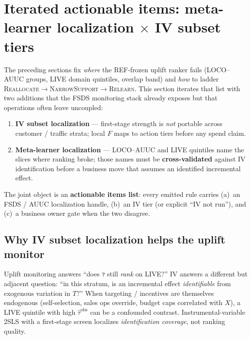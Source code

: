
\section{Iterated actionable items: meta-learner localization $\times$ IV subset tiers}
\label{sec:actionables-meta-iv}

The preceding sections fix \emph{where} the REF-frozen uplift ranker fails
(LOCO--AUUC groups, LIVE domain quintiles, overlap band) and \emph{how} to
ladder \textsc{Reallocate}$\to$\textsc{NarrowSupport}$\to$\textsc{Relearn}.
This section iterates that list with two additions that the FSDS monitoring
stack already exposes but that operations often leave uncoupled:
\begin{enumerate}\itemsep2pt
  \item \textbf{IV subset localization} --- first-stage strength is
        \emph{not} portable across customer / traffic strata; local $F$
        maps to action tiers before any spend claim.
  \item \textbf{Meta-learner localization} --- LOCO--AUUC and LIVE
        quintiles name the slices where ranking broke; those names must be
        \textbf{cross-validated} against IV identification before a
        business move that assumes an identified incremental effect.
\end{enumerate}
The joint object is an \textbf{actionable items list}: every emitted rule
carries (a)~an FSDS / AUUC localization handle, (b)~an IV tier (or
explicit ``IV not run''), and (c)~a business owner gate when the two
disagree.

\subsection{Why IV subset localization helps the uplift monitor}
\label{sec:iv-helps-monitor}

Uplift monitoring answers ``does $\hat\tau$ still \emph{rank} on LIVE?''
IV answers a different but adjacent question: ``in this stratum, is an
incremental effect \emph{identifiable} from exogenous variation in $T$?''
When targeting / incentives are themselves endogenous (self-selection,
sales ops override, budget caps correlated with $X$), a LIVE quintile with
high $\widehat{\tau}^{\mathrm{obs}}$ can be a confounded contrast.
Instrumental-variable 2SLS with a first-stage screen localizes
\emph{identification coverage}, not ranking quality.

